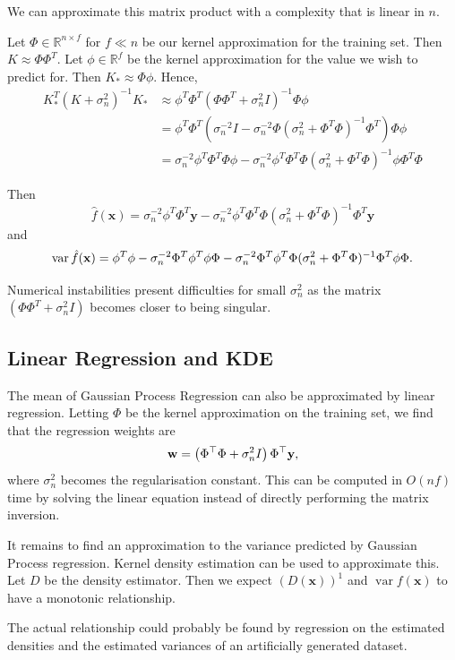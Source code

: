 \documentclass[11pt,twoside,openright]{report}
\newcommand\bbR{\mathbb{R}}
\newcommand\bw{\mathbf{w}}
\newcommand\bx{\mathbf{x}}
\newcommand\by{\mathbf{y}}
\DeclareMathOperator{\var}{var}
\begin{document}
We can approximate this matrix product with a complexity that is linear in $n$.

Let $\Phi \in \bbR^{n \times f}$ for $f \ll n$ be our kernel approximation for the training set. Then $K \approx \Phi \Phi^T$. Let $\phi \in \bbR^{f}$ be the kernel approximation for the value we wish to predict for. Then $K_* \approx \Phi \phi$. Hence,\begin{align*}
    K_*^T(K+\sigma_n^2)^{-1}K_* &\approx \phi^T\Phi^T  \left(\Phi \Phi^T + \sigma_n^2I\right)^{-1} \Phi\phi \\
    &= \phi^T\Phi^T  \left( \sigma_n^{-2}I - \sigma_n^{-2}\Phi(\sigma_n^{2} + \Phi^T\Phi)^{-1}\Phi^T\right) \Phi\phi \\
    &=  \sigma_n^{-2}\phi^T\Phi^T\Phi\phi - \sigma_n^{-2}\phi^T\Phi^T \Phi(\sigma_n^{2} + \Phi^T\Phi)^{-1}\phi\Phi^T\Phi
\end{align*}

Then \[
    \hat f(\bx) = \sigma_n^{-2} \phi^T\Phi^T\by - \sigma_n^{-2} \phi^T\Phi^T\Phi(\sigma_n^{2} + \Phi^T\Phi)^{-1}\Phi^T\by
\] and \[
    \var \hat f(\bx) = \phi^T\phi - \sigma_n^{-2}\Phi^T \phi^T\phi\Phi - \sigma_n^{-2}\Phi^T \phi^T\Phi(\sigma_n^{2} + \Phi^T\Phi)^{-1}\Phi^T\phi\Phi\text.
\]

Numerical instabilities present difficulties for small $\sigma_n^2$ as the matrix $(\Phi\Phi^T + \sigma_n^2I)$ becomes closer to being singular.

\subsection{Linear Regression and KDE}

The mean of Gaussian Process Regression can also be approximated by linear regression. Letting $\Phi$ be the kernel approximation on the training set, we find that the regression weights are\[
    \bw = \left(\Phi^\top\Phi + \sigma_n^2 I\right) \Phi^\top\by\text,
\] where $\sigma_n^2$ becomes the regularisation constant. This can be computed in $O(nf)$ time by solving the linear equation instead of directly performing the matrix inversion.

It remains to find an approximation to the variance predicted by Gaussian Process regression. Kernel density estimation can be used to approximate this. Let $D$ be the density estimator. Then we expect $\left(D(\bx)\right)^1$ and $\var f(\bx)$ to have a monotonic relationship.

The actual relationship could probably be found by regression on the estimated densities and the estimated variances of an artificially generated dataset.
\end{document}
